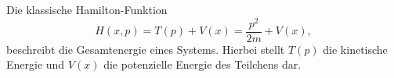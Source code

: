 
Die klassische Hamilton-Funktion
\begin{equation}
	H(x, p) = T(p) + V(x) = \frac{p^2}{2m} + V(x),
\end{equation}
beschreibt die Gesamtenergie eines Systems.
Hierbei stellt $T(p)$ die kinetische Energie und $V(x)$ die potenzielle Energie des Teilchens dar.


